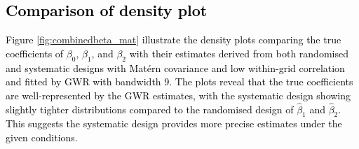 \documentclass[a4paper]{article} 	%
\newcommand{\Matern}{Mat\'ern }
\newcommand{\zc}[1]{\textcolor{black}{#1}}
\begin{document}
\subsection{\zc{Comparison of density plot}}

\zc{Figure \ref{fig:combinedbeta_mat} illustrate the density plots comparing the true coefficients of $\beta_0$, $\beta_1$, and $\beta_2$ with their estimates derived from both randomised and systematic designs with \Matern covariance and low within-grid correlation and fitted by GWR with bandwidth 9. The plots reveal that the true coefficients are well-represented by the GWR estimates, with the systematic design showing slightly tighter distributions compared to the randomised design of $\hat{\beta}_1$ and $\hat{\beta}_2$. This suggests the systematic design provides more precise estimates under the given conditions.}
\end{document}
